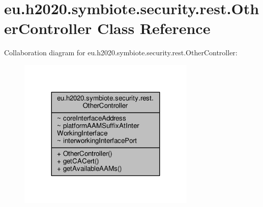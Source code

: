 \hypertarget{classeu_1_1h2020_1_1symbiote_1_1security_1_1rest_1_1OtherController}{}\section{eu.\+h2020.\+symbiote.\+security.\+rest.\+Other\+Controller Class Reference}
\label{classeu_1_1h2020_1_1symbiote_1_1security_1_1rest_1_1OtherController}


Collaboration diagram for eu.\+h2020.\+symbiote.\+security.\+rest.\+Other\+Controller\+:
\nopagebreak
\begin{figure}[H]
\begin{center}
\leavevmode
\includegraphics[width=239pt]{classeu_1_1h2020_1_1symbiote_1_1security_1_1rest_1_1OtherController__coll__graph}
\end{center}
\end{figure}
